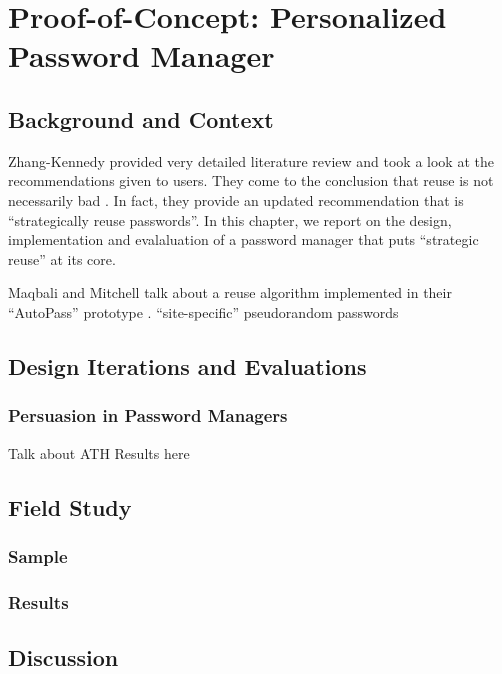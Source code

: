 \chapter[Proof-of-Concept: Personalized Password Manager]{Proof-of-Concept: Personalized Password Manager}\label{chap:pwrm}

\section{Background and Context}

Zhang-Kennedy \etal provided very detailed literature review and took a look at the recommendations given to users. They come to the conclusion that reuse is not necessarily bad \cite[p.8-9]{ZhangKennedy2016RevisitingPasswordRules}. In fact, they provide an updated recommendation that is ``strategically reuse passwords''. In this chapter, we report on the design, implementation and evalaluation of a password manager that puts ``strategic reuse'' at its core. 


Maqbali and Mitchell talk about a reuse algorithm implemented in their ``AutoPass'' prototype \cite{Maqbali2016PasswordGenerators}.
``site-specific'' pseudorandom passwords

\section{Design Iterations and Evaluations}

\subsection{Persuasion in Password Managers}
Talk about ATH Results here


\section{Field Study}
\subsection{Sample}
\subsection{Results}

\section{Discussion}

